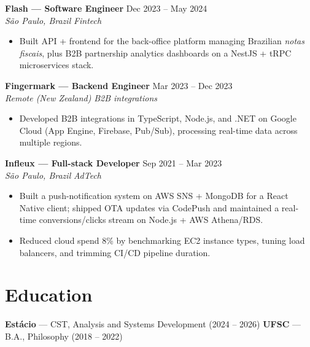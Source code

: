\documentclass[10pt,letterpaper]{article}
\newcommand{\role}[4]{%
  \noindent\textbf{#1} \hfill #2\\
  \textit{#3} \hfill \textit{#4}\par\vspace{0pt}%
}
\begin{document}
\role{Flash --- Software Engineer}{Dec 2023 -- May 2024}{S\~ao Paulo, Brazil}{Fintech}
\begin{itemize}
  \item Built API + frontend for the back-office platform managing Brazilian \textit{notas fiscais}, plus B2B partnership analytics dashboards on a NestJS + tRPC microservices stack.
\end{itemize}

\role{Fingermark --- Backend Engineer}{Mar 2023 -- Dec 2023}{Remote (New Zealand)}{B2B integrations}
\begin{itemize}
  \item Developed B2B integrations in TypeScript, Node.js, and .NET on Google Cloud (App Engine, Firebase, Pub/Sub), processing real-time data across multiple regions.
\end{itemize}

\role{Infleux --- Full-stack Developer}{Sep 2021 -- Mar 2023}{S\~ao Paulo, Brazil}{AdTech}
\begin{itemize}
  \item Built a push-notification system on AWS SNS + MongoDB for a React Native client; shipped OTA updates via CodePush and maintained a real-time conversions/clicks stream on Node.js + AWS Athena/RDS.
  \item Reduced cloud spend 8\% by benchmarking EC2 instance types, tuning load balancers, and trimming CI/CD pipeline duration.
\end{itemize}

\section*{Education}
\noindent\textbf{Est\'acio} --- CST, Analysis and Systems Development (2024 -- 2026) \hfill \textbf{UFSC} --- B.A., Philosophy (2018 -- 2022)
\end{document}
